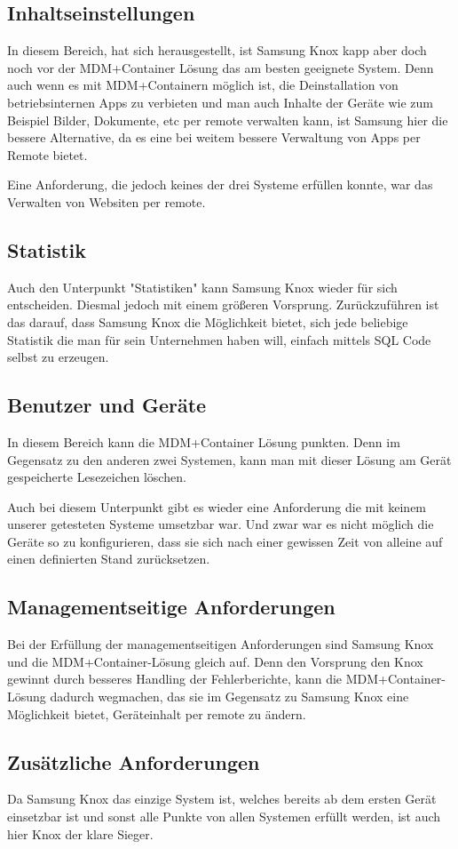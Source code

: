 \subsection{Inhaltseinstellungen}
In diesem Bereich, hat sich herausgestellt, ist Samsung Knox kapp aber doch noch vor der MDM+Container Lösung das am besten geeignete System. Denn auch wenn es mit MDM+Containern möglich ist, die Deinstallation von betriebsinternen Apps zu verbieten und man auch Inhalte der Geräte wie zum Beispiel Bilder, Dokumente, etc per remote verwalten kann, ist Samsung hier die bessere Alternative, da es eine bei weitem bessere Verwaltung von Apps per Remote bietet. \par
Eine Anforderung, die jedoch keines der drei Systeme erfüllen konnte, war das Verwalten von Websiten per remote.
\subsection{Statistik}
Auch den Unterpunkt "Statistiken" kann Samsung Knox wieder für sich entscheiden. Diesmal jedoch mit einem größeren Vorsprung. Zurückzuführen ist das darauf, dass Samsung Knox die Möglichkeit bietet, sich jede beliebige Statistik die man für sein Unternehmen haben will, einfach mittels SQL Code selbst zu erzeugen.
\subsection{Benutzer und Geräte}
In diesem Bereich kann die MDM+Container Lösung punkten. Denn im Gegensatz zu den anderen zwei Systemen, kann man mit dieser Lösung am Gerät gespeicherte Lesezeichen löschen. \par
Auch bei diesem Unterpunkt gibt es wieder eine Anforderung die mit keinem unserer getesteten Systeme umsetzbar war. Und zwar war es nicht möglich die Geräte so zu konfigurieren, dass sie sich nach einer gewissen Zeit von alleine auf einen definierten Stand zurücksetzen.
\subsection{Managementseitige Anforderungen}
Bei der Erfüllung der managementseitigen Anforderungen sind Samsung Knox und die MDM+Container-Lösung gleich auf. Denn den Vorsprung den Knox gewinnt durch besseres Handling der Fehlerberichte, kann die MDM+Container-Lösung dadurch wegmachen, das sie im Gegensatz zu Samsung Knox eine Möglichkeit bietet, Geräteinhalt per remote zu ändern.
\subsection{Zusätzliche Anforderungen}
Da Samsung Knox das einzige System ist, welches bereits ab dem ersten Gerät einsetzbar ist und sonst alle Punkte von allen Systemen erfüllt werden, ist auch hier Knox der klare Sieger.


